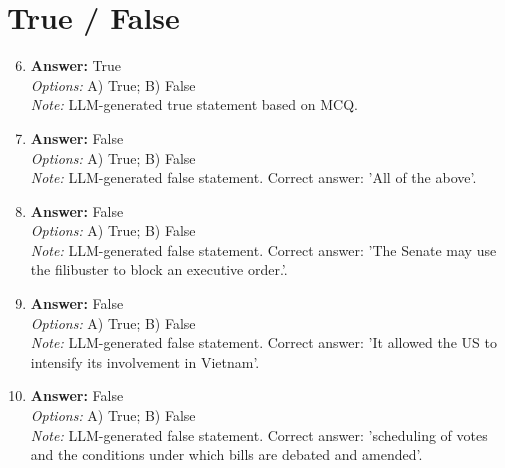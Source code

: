 \documentclass[12pt]{article}
\begin{document}
\section*{True / False}
\begin{enumerate}[label=\arabic*.]
\setcounter{enumi}{5}
\item \textbf{Answer:} True
\\ \textit{Options:} A) True; B) False
\\ \textit{Note:} LLM-generated true statement based on MCQ.
\item \textbf{Answer:} False
\\ \textit{Options:} A) True; B) False
\\ \textit{Note:} LLM-generated false statement. Correct answer: 'All of the above'.
\item \textbf{Answer:} False
\\ \textit{Options:} A) True; B) False
\\ \textit{Note:} LLM-generated false statement. Correct answer: 'The Senate may use the filibuster to block an executive order.'.
\item \textbf{Answer:} False
\\ \textit{Options:} A) True; B) False
\\ \textit{Note:} LLM-generated false statement. Correct answer: 'It allowed the US to intensify its involvement in Vietnam'.
\item \textbf{Answer:} False
\\ \textit{Options:} A) True; B) False
\\ \textit{Note:} LLM-generated false statement. Correct answer: 'scheduling of votes and the conditions under which bills are debated and amended'.
\end{enumerate}
\end{document}
